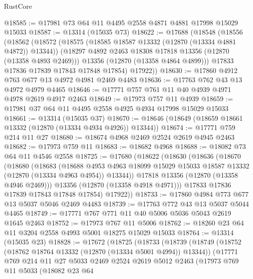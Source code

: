\begin{lexlean}{RustCore}
\begin{coremodule}
@18585 := @17981 @73 @64 @11 @4495 @2558 @4871 @4881 @17998 @15029 @15033
@18587 := @13314 (@15035 @73)
@18622 := @17688
    (@18548
      (@18556
        (@18562
          (@18572
            (@18575 (@18585 @18587 @13332 (@12870 (@13334 @4881 @4872)) @13344))
            (@18297 @4892 @2463 @18308 @17818 @13356 (@12870 (@13358 @4893 @2469)))
            @13356
            (@12870 (@13358 @4864 @4899)))
          @17833
          @17836
          @17839
          @17843
          @17848
          @17854)
        @17922))
@18630 := @17860 @4912 @763 @677 @13 @4972 @4981 @2469 @4483
@18636 := @17763 @762 @43 @13 @4972 @4979 @4465
@18646 := @17771 @757 @761 @11 @40 @4939 @4971 @4978 @2619 @4917 @2463
@18649 := @17973 @757 @11 @4939
@18659 := @17981 @37 @64 @11 @4495 @2558 @4925 @4934 @17998 @15029 @15033
@18661 := @13314 (@15035 @37)
@18670 := @18646 (@18649 (@18659 @18661 @13332 (@12870 (@13334 @4934 @4926)) @13344))
@18674 := @17771 @759 @214 @11 @27
@18680 := @18674 @4968 @2469 @2524 @2619 @4945 @2463
@18682 := @17973 @759 @11
@18683 := @18682 @4968
@18688 := @18082 @73 @64 @11 @4546 @2558
@18725 := @17680
    (@18622
      (@18630
        (@18636
          (@18670
            (@18680
              (@18683
                (@18688
                  @4953
                  @4963
                  @18099
                  @15029
                  @15033
                  @18587
                  @13332
                  (@12870 (@13334 @4963 @4954))
                  @13344))
              @17818
              @13356
              (@12870 (@13358 @4946 @2469)))
            @13356
            (@12870 (@13358 @4918 @4971)))
          @17833
          @17836
          @17839
          @17843
          @17848
          @17854)
        @17922))
@18733 := @17860 @4984 @773 @677 @13 @5037 @5046 @2469 @4483
@18739 := @17763 @772 @43 @13 @5037 @5044 @4465
@18749 := @17771 @767 @771 @11 @40 @5006 @5036 @5043 @2619 @1645 @2463
@18752 := @17973 @767 @11 @5006
@18762 := @18260 @23 @64 @11 @3204 @2558 @4993 @5001 @18275 @15029 @15033
@18764 := @13314 (@15035 @23)
@18828 := @17672
    (@18725
      (@18733
        (@18739
          (@18749
            (@18752 (@18762 @18764 @13332 (@12870 (@13334 @5001 @4994)) @13344))
            (@17771
              @769
              @214
              @11
              @27
              @5033
              @2469
              @2524
              @2619
              @5012
              @2463
              (@17973
                @769
                @11
                @5033
                (@18082
                  @23
                  @64

\end{coremodule}
\end{lexlean}
